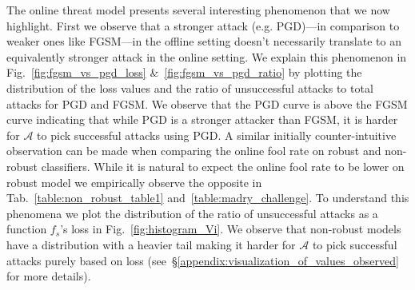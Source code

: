  The online threat model presents several interesting phenomenon that we now highlight. First we observe that a stronger attack (e.g. PGD)---in comparison to weaker ones like FGSM---in the offline setting doesn't necessarily translate to an equivalently stronger attack in the online setting. We explain this phenomenon in Fig.~\ref{fig:fgsm_vs_pgd_loss} \&~\ref{fig:fgsm_vs_pgd_ratio} by plotting the distribution of the loss values and the ratio of unsuccessful attacks to total attacks for PGD and FGSM. We observe that the PGD curve is above the FGSM curve indicating that while PGD is a stronger attacker than FGSM, it is harder for $\mathcal{A}$ to pick successful attacks using PGD. A similar initially counter-intuitive observation can be made when comparing the online fool rate on robust and non-robust classifiers. While it is natural to expect the online fool rate to be lower on robust model we empirically observe the opposite in Tab.~\ref{table:non_robust_table1} and~\ref{table:madry_challenge}. To understand this phenomena we plot the distribution of the ratio of unsuccessful attacks as a function $f_s$'s loss in Fig.~\ref{fig:histogram_Vi}. We observe that non-robust models have a distribution with a heavier tail making it harder for $\mathcal{A}$ to pick successful attacks purely based on loss (see~\S\ref{appendix:visualization_of_values_observed} for more details). 
